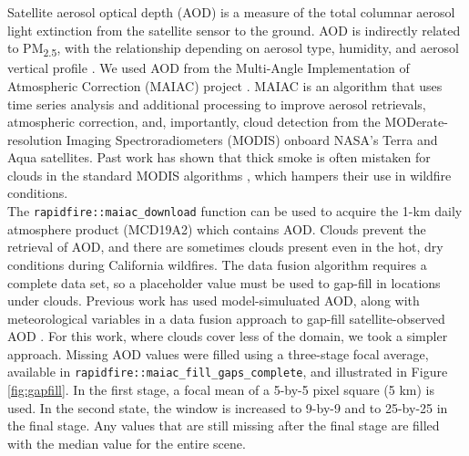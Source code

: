 \documentclass[gmd, manuscript]{copernicus}
\begin{document}
Satellite aerosol optical depth (AOD) is a measure of the total columnar
aerosol light extinction from the satellite sensor to the ground. AOD is
indirectly related to PM\textsubscript{2.5}, with the relationship
depending on aerosol type, humidity, and aerosol vertical profile
\citep{Li2015}. We used AOD from the Multi-Angle Implementation of
Atmospheric Correction (MAIAC) project \citep{Lyapustin2011}. MAIAC is
an algorithm that uses time series analysis and additional processing to
improve aerosol retrievals, atmospheric correction, and, importantly,
cloud detection from the MODerate-resolution Imaging Spectroradiometers
(MODIS) onboard NASA's Terra and Aqua satellites. Past work has shown
that thick smoke is often mistaken for clouds in the standard MODIS
algorithms \citep{vanDonkelaar2011}, which hampers their use in wildfire
conditions.\\
The \texttt{rapidfire::maiac\_download} function can be used to acquire
the 1-km daily atmosphere product (MCD19A2) which contains AOD. Clouds
prevent the retrieval of AOD, and there are sometimes clouds present
even in the hot, dry conditions during California wildfires. The data
fusion algorithm requires a complete data set, so a placeholder value
must be used to gap-fill in locations under clouds. Previous work has
used model-simuluated AOD, along with meteorological variables in a data
fusion approach to gap-fill satellite-observed AOD \citep{Zou2019}. For
this work, where clouds cover less of the domain, we took a simpler
approach. Missing AOD values were filled using a three-stage focal
average, available in \texttt{rapidfire::maiac\_fill\_gaps\_complete},
and illustrated in Figure \ref{fig:gapfill}. In the first stage, a focal
mean of a 5-by-5 pixel square (5 km) is used. In the second state, the
window is increased to 9-by-9 and to 25-by-25 in the final stage. Any
values that are still missing after the final stage are filled with the
median value for the entire scene.
\end{document}
